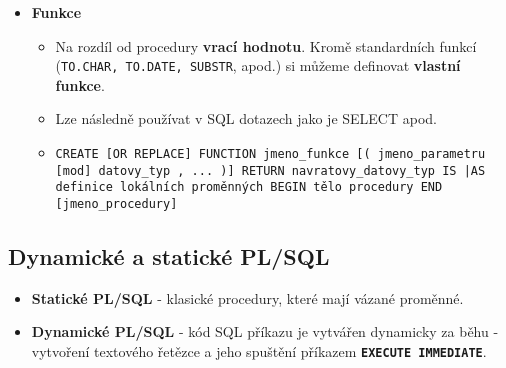 \begin{itemize}
    \item \textbf{Funkce}
          \begin{itemize}
              \item Na rozdíl od procedury \textbf{vrací hodnotu}. Kromě standardních funkcí (\texttt{TO.CHAR, TO.DATE, SUBSTR}, apod.) si můžeme definovat \textbf{vlastní funkce}.
              \item Lze následně používat v SQL dotazech jako je SELECT apod.
              \item \texttt{CREATE [OR REPLACE] FUNCTION jmeno\_funkce [( jmeno\_parametru [mod] datovy\_typ , ... )] RETURN navratovy\_datovy\_typ IS |AS definice lokálních proměnných BEGIN tělo procedury END [jmeno\_procedury]}
          \end{itemize}
\end{itemize}

\subsection{Dynamické a statické PL/SQL}
\begin{itemize}
    \item \textbf{Statické PL/SQL} - klasické procedury, které mají vázané proměnné.
    \item \textbf{Dynamické PL/SQL} - kód SQL příkazu je vytvářen dynamicky za běhu - vytvoření textového řetězce a jeho spuštění příkazem \textbf{\texttt{EXECUTE IMMEDIATE}}.
\end{itemize}

